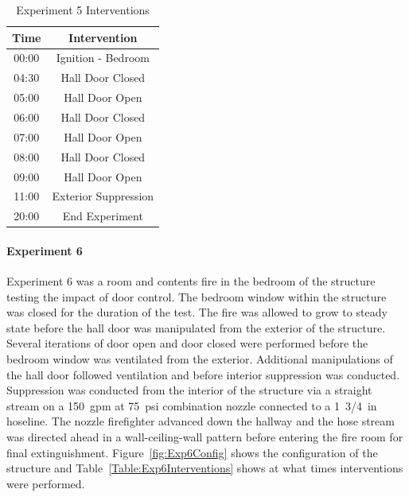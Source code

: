 \documentclass[12pt,oneside]{book}
\begin{document}
\begin{table}[H]
	\centering
	\caption{Experiment 5 Interventions}
	\begin{tabular}{|c|c|} 
		\hline
		Time & Intervention \\ \hline \hline
		00:00 & Ignition - Bedroom \\ \hline
		04:30 & Hall Door Closed \\ \hline
		05:00 & Hall Door Open \\ \hline
		06:00 & Hall Door Closed \\ \hline
		07:00 & Hall Door Open \\ \hline
		08:00 & Hall Door Closed \\ \hline
		09:00 & Hall Door Open \\ \hline
		11:00 & Exterior Suppression \\ \hline
		20:00 & End Experiment\\ \hline
	\end{tabular}
	\label{Table:Exp5Interventions}
\end{table}

\clearpage

\paragraph{Experiment 6} \mbox{}

Experiment 6 was a room and contents fire in the bedroom of the structure testing the impact of door control. The bedroom window within the structure was closed for the duration of the test. The fire was allowed to grow to steady state before the hall door was manipulated from the exterior of the structure. Several iterations of door open and door closed were performed before the bedroom window was ventilated from the exterior. Additional manipulations of the hall door followed ventilation and before interior suppression was conducted. Suppression was conducted from the interior of the structure via a straight stream on a 150~gpm at 75~psi combination nozzle connected to a 1~3/4~in hoseline. The nozzle firefighter advanced down the hallway and the hose stream was directed ahead in a wall-ceiling-wall pattern before entering the fire room for final extinguishment. Figure~\ref{fig:Exp6Config} shows the configuration of the structure and Table~\ref{Table:Exp6Interventions} shows at what times interventions were performed.

\end{document}
